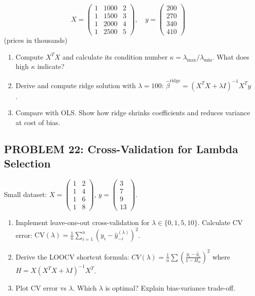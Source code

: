 \documentclass[12pt]{article}
\begin{document}
\[
X = \begin{pmatrix}
1 & 1000 & 2 \\
1 & 1500 & 3 \\
1 & 2000 & 4 \\
1 & 2500 & 5
\end{pmatrix}, \quad
y = \begin{pmatrix} 200 \\ 270 \\ 340 \\ 410 \end{pmatrix}
\]
(prices in thousands)

\begin{enumerate}
\item[(a)] Compute \(X^TX\) and calculate its condition number \(\kappa = \lambda_{\max}/\lambda_{\min}\). What does high \(\kappa\) indicate?
\item[(b)] Derive and compute ridge solution with \(\lambda = 100\): \(\hat{\beta}^{\text{ridge}} = (X^TX + \lambda I)^{-1}X^Ty\).
\item[(c)] Compare with OLS. Show how ridge shrinks coefficients and reduces variance at cost of bias.
\end{enumerate}

\subsection*{PROBLEM 22: Cross-Validation for Lambda Selection}

Small dataset: \(X = \begin{pmatrix} 1 & 2 \\ 1 & 4 \\ 1 & 6 \\ 1 & 8 \end{pmatrix}\), \(y = \begin{pmatrix} 3 \\ 7 \\ 9 \\ 13 \end{pmatrix}\).

\begin{enumerate}
\item[(a)] Implement leave-one-out cross-validation for \(\lambda \in \{0, 1, 5, 10\}\). Calculate CV error: \(\text{CV}(\lambda) = \frac{1}{n}\sum_{i=1}^n (y_i - \hat{y}_{-i}^{(\lambda)})^2\).
\item[(b)] Derive the LOOCV shortcut formula: \(CV(\lambda) = \frac{1}{n}\sum \left(\frac{y_i - \hat{y}_i}{1 - H_{ii}}\right)^2\) where \(H = X(X^TX + \lambda I)^{-1}X^T\).
\item[(c)] Plot CV error vs \(\lambda\). Which \(\lambda\) is optimal? Explain bias-variance trade-off.
\end{enumerate}
\end{document}
